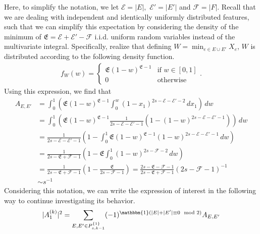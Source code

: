 \documentclass[letterpaper,10pt]{article}
\numberwithin{equation}{section}
\numberwithin{thm}{section}
\numberwithin{lem}{section}
\numberwithin{cor}{section}
\newcommand{\1}{\mathbb{1}}
\begin{document}
Here, to simplify the notation, we let $\mathcal{E} = |E|,$ $\mathcal{E}' = |E'|$ and $\mathcal{F} = |F|$.
Recall that we are dealing with independent and identically uniformly distributed features, such that we can simplify this expectation by considering the density of the minimum of $\mathfrak{E} = \mathcal{E} + \mathcal{E}' - \mathcal{F}$ i.i.d. uniform random variables instead of the multivariate integral.
Specifically, realize that defining $W = \min_{e \in E \cup E'} X_e$, $W$ is distributed according to the following density function.
\begin{equation*}
	\begin{aligned}
		f_W(w) = \begin{cases}
			         \mathfrak{E}\left(1-w\right)^{\mathfrak{E}- 1} & \text{if } w \in [0,1] \\
			         0                                              & \text{otherwise}
		         \end{cases}.
	\end{aligned}
\end{equation*}
Using this expression, we find that
\begin{equation*}
	\begin{aligned}
		A_{E, E'}
		 & = \int_{0}^{1}\left(\mathfrak{E}\left(1-w\right)^{\mathfrak{E}- 1}\int_{0}^{w} (1-x_1)^{2s - \mathcal{E} - \mathcal{E}' - 2} \, dx_1 \right) \, dw                                                     \\
		 & = \int_{0}^{1}\left(\mathfrak{E}\left(1-w\right)^{\mathfrak{E}- 1} \frac{1}{2s - \mathcal{E} - \mathcal{E}' - 1}\left(1 - \left(1 - w\right)^{2s - \mathcal{E} - \mathcal{E}' - 1}\right)\right) \, dw \\
		 & =  \frac{1}{2s - \mathcal{E} - \mathcal{E}' - 1}\left(1 -\int_{0}^{1} \mathfrak{E}\left(1-w\right)^{\mathfrak{E}- 1}\left(1 - w\right)^{2s - \mathcal{E} - \mathcal{E}' - 1} \, dw\right)              \\
		 & =  \frac{1}{2s - \mathfrak{E} + \mathcal{F} - 1}\left(1 - \mathfrak{E}\int_{0}^{1} \left(1 - w\right)^{2s - \mathcal{F} - 2} \, dw\right)                                                              \\
		 & = \frac{1}{2s - \mathfrak{E} + \mathcal{F} - 1}\left(1 - \frac{\mathfrak{E}}{2s - \mathcal{F} - 1}\right)
		= \frac{2s -\mathfrak{E} - \mathcal{F} - 1 }{2s - \mathfrak{E} + \mathcal{F} - 1}\left(2s - \mathcal{F} - 1\right)^{-1}                                                                                   \\
		 & \sim s^{-1}
	\end{aligned}
\end{equation*}
Considering this notation, we can write the expression of interest in the following way to continue investigating its behavior.
\begin{equation*}
	\begin{aligned}
		|A_1^{(k)}|^2
		= \sum_{E, E' \in P_{s,k-1}^{\{1\}}}(-1)^{\mathbbm{1}(|E| + | E'| \equiv 0 \mod 2)}A_{E, E'}
	\end{aligned}
\end{equation*}
\end{document}

